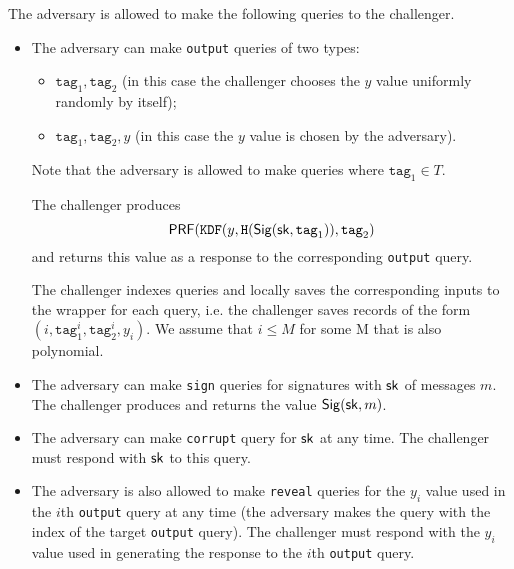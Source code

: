 \documentclass{article}
\begin{document}


The adversary is allowed to make the following queries to the challenger.


\begin{itemize}
	
	\item The adversary can make \texttt{output} queries of two types:
	\begin{itemize}
		\item $\texttt{tag}_1, \texttt{tag}_2$ (in this case the challenger chooses the $y$ value uniformly randomly by itself);
		\item $\texttt{tag}_1, \texttt{tag}_2,y$ (in this case the $y$ value is chosen by the adversary).
	\end{itemize}
	
	Note that the adversary is allowed to make queries where $\texttt{tag}_1 \in T$. 
	
	The challenger produces $$
	\mathsf{PRF}(\texttt{KDF}(y, \texttt{H}(\mathsf{Sig} (\mathsf{sk},\texttt{tag}_1)), \texttt{tag}_2 )
	$$
	and returns this value as a response to the corresponding \texttt{output} query.
	
	The challenger indexes queries and locally saves the corresponding inputs to the wrapper for each query, i.e. the challenger saves records of the form $(i,\texttt{tag}_1^i,\texttt{tag}_2^i,y_i)$.  We assume that $i \le M$ for some M that is also polynomial.
	
	\item The adversary can make \texttt{sign} queries for signatures with $\mathsf{sk}$ of messages $m$. The challenger produces and returns the value $\mathsf{Sig} (\mathsf{sk}, m)$.
	
	\item The adversary can make \texttt{corrupt} query for $\mathsf{sk}$ at any time. The challenger must respond with $\mathsf{sk}$ to this query.
	
	\item The adversary is also allowed to make \texttt{reveal} queries for the $y_i$ value used in the $i$th \texttt{output} query at any time (the adversary makes the query with the index of the target \texttt{output} query). The challenger must respond with the $y_i$ value used in generating the response to the $i$th \texttt{output} query.
	

\end{itemize}
\end{document}
